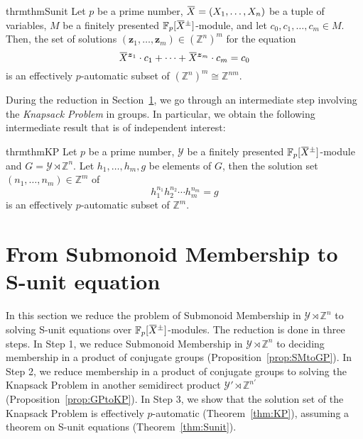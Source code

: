 \documentclass[a4paper,UKenglish,cleveref, autoref, thm-restate]{lipics-v2021}
\newcommand{\Z}{\mathbb{Z}}
\newcommand{\F}{\mathbb{F}}
\newcommand{\mY}{\mathcal{Y}}
\newcommand{\bz}{\boldsymbol{z}}
\newcommand{\oX}{\mkern 1.5mu\overline{\mkern-1.5mu X \mkern-1.5mu}\mkern 1.5mu}
\theoremstyle{definition}
\theoremstyle{definition}
\theoremstyle{definition}
\begin{document}
\begin{restatable}{thrm}{thmSunit}\label{thm:Sunit}
    Let $p$ be a prime number, $\oX = (X_1, \ldots, X_n)$ be a tuple of variables, $M$ be a finitely presented $\F_p[\oX^{\pm}]$-module, and let $c_0, c_1, \ldots, c_m \in M$.
    Then, the set of solutions $(\bz_1, \ldots, \bz_m) \in \left(\Z^{n}\right)^{m}$ for the equation
    \begin{equation}\label{eq:Sunitori}
        \oX^{\bz_1} \cdot c_1 + \cdots + \oX^{\bz_m} \cdot c_m = c_0
    \end{equation}
    is an effectively $p$-automatic subset of $\left(\Z^{n}\right)^{m} \cong \Z^{nm}$.
\end{restatable}

During the reduction in Section~\ref{sec:SMtoSunit}, we go through an intermediate step involving the \emph{Knapsack Problem} in groups. In particular, we obtain the following intermediate result that is of independent interest:

\begin{restatable}{thrm}{thmKP}\label{thm:KP}
    Let $p$ be a prime number, $\mY$ be a finitely presented $\F_p[\oX^{\pm}]$-module and $G = \mY \rtimes \Z^n$. 
    Let $h_1, \ldots, h_m, g$ be elements of $G$, then the solution set $(n_1, \ldots, n_m) \in \Z^m$ of
    \begin{equation}\label{eq:KP}
        h_1^{n_1} h_2^{n_2} \cdots h_m^{n_m} = g
    \end{equation}
    is an effectively $p$-automatic subset of $\Z^m$.
\end{restatable}

\section{From Submonoid Membership to S-unit equation}\label{sec:SMtoSunit}

In this section we reduce the problem of Submonoid Membership in $\mY \rtimes \Z^n$ to solving S-unit equations over $\F_p[\oX^{\pm}]$-modules.
The reduction is done in three steps. In Step 1, we reduce Submonoid Membership in $\mY \rtimes \Z^n$ to deciding membership in a product of conjugate groups (Proposition~\ref{prop:SMtoGP}). In Step 2, we reduce membership in a product of conjugate groups to solving the Knapsack Problem in another semidirect product $\mY' \rtimes \Z^{n'}$ (Proposition~\ref{prop:GPtoKP}). In Step 3, we show that the solution set of the Knapsack Problem is effectively $p$-automatic (Theorem~\ref{thm:KP}), assuming a theorem on S-unit equations (Theorem~\ref{thm:Sunit}).
\end{document}
